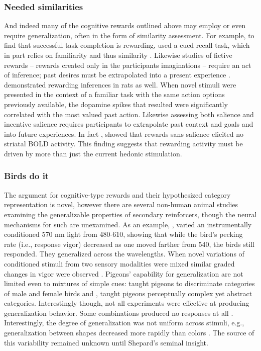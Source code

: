 \subsubsection{Needed similarities}
\label{subsub:needed}
And indeed many of the cognitive rewards outlined above may employ or even require generalization, often in the form of similarity assessment.  For example, to find that successful task completion is rewarding,  used a cued recall task, which in part relies on familiarity \cite{Jacoby:1991p9096} and thus similarity \cite{Nosofsky:1988p9098}.  Likewise studies of fictive rewards -- rewards created only in the participants imaginations -- require an act of inference; past desires must be extrapolated into a present experience \cite{Hayden:2009p6545,Lohrenz:2007p7240}.  demonstrated rewarding inferences in rats as well.  When novel stimuli were presented in the context of a familiar task with the same action options previously available, the dopamine spikes that resulted were significantly correlated with the most valued past action.  Likewise assessing both salience and incentive salience requires participants to extrapolate past context and goals and into future experiences.  In fact , showed that rewards sans salience elicited no striatal BOLD activity.  This finding suggests that rewarding activity must be driven by more than just the current hedonic stimulation.

\subsubsection{Birds do it}
\label{subsub:birds}
The argument for cognitive-type rewards and their hypothesized category representation is novel, however there are several non-human animal studies examining the generalizable properties of secondary reinforcers, though the neural mechanisms for such are unexamined.  As an example, , varied an instrumentally conditioned 570 nm light from 480-610, showing that while the bird's pecking rate (i.e., response vigor) decreased as one moved farther from 540, the birds still responded.  They generalized across the wavelengths.  When novel variations of conditioned stimuli from two sensory modalities were mixed similar graded changes in vigor were observed  \cite{Guttman:1956p8355}.  Pigeons' capability for generalization are not limited even to mixtures of simple cues: \cite{Nakamura:2006p9093} taught pigeons to discriminate categories of male and female birds and , taught pigeons perceptually complex yet abstract categories.  Interestingly though, not all experiments were effective at producing generalization behavior.  Some combinations produced no responses at all \cite{Blough:2001p8408,Simmons:2008p8405,Urcuioli:2001p8359}.  Interestingly, the degree of generalization was not uniform across stimuli, e.g., generalization between shapes decreased more rapidly than colors \cite{Shepard:1987p9102}.  The source of this variability remained unknown until Shepard's seminal insight.


